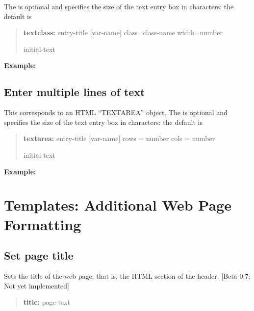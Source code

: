 \documentclass[letterpaper,10pt,english]{sphinxmanual}
\begin{document}
The  is optional and specifies the size of the text
entry box in characters: the default is 
\begin{quote}

\begin{DUlineblock}{0em}
\item[] \textbf{textclass:} entry-title {[}var-name{]} class=class-name
width=number
\item[] initial-text
\end{DUlineblock}
\end{quote}

\textbf{Example:}
\begin{quote}

\end{quote}


\subsection{Enter multiple lines of text}
\label{forms:enter-multiple-lines-of-text}
This corresponds to an HTML “TEXTAREA” object. The
 is optional and specifies the size of
the text entry box in characters: the default is 
\begin{quote}

\begin{DUlineblock}{0em}
\item[] \textbf{textarea:} entry-title {[}var-name{]} rows = number cols = number
\item[] initial-text
\end{DUlineblock}
\end{quote}

\textbf{Example:}
\begin{quote}

\end{quote}


\section{Templates: Additional Web Page Formatting}
\label{forms:templates-additional-web-page-formatting}

\subsection{Set page title}
\label{forms:set-page-title}
Sets the title of the web page: that is, the HTML
 section of the header. {[}Beta 0.7: Not yet
implemented{]}
\begin{quote}

\begin{DUlineblock}{0em}
\item[] \textbf{title:} page-text
\end{DUlineblock}
\end{quote}
\end{document}
